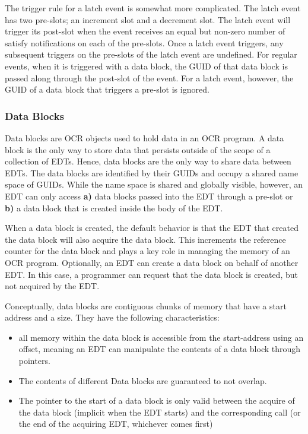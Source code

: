 The trigger rule for a latch event is somewhat more complicated. The
latch event has two pre-slots; an increment slot and a decrement
slot. The latch event will trigger its post-slot when the event
receives an equal but non-zero number of satisfy notifications on each
of the pre-slots. Once a latch event triggers, any subsequent
triggers on the pre-slots of the latch event are undefined. For
regular events, when it is triggered with a data block, the GUID of
that data block is passed along through the post-slot of the
event. For a latch event, however, the GUID of a data block that
triggers a pre-slot is ignored.

\subsubsection{Data Blocks}
\label{sec:datablocks}
Data blocks are OCR objects used to hold data in an OCR program. A
data block is the only way to store data that persists outside of the
scope of a collection of EDTs. Hence, data blocks are the only way to
share data between EDTs. The data blocks are identified by their
GUIDs and occupy a shared name space of GUIDs. While the name space
is shared and globally visible, however, an EDT can only access {\bf a)}
data blocks passed into the EDT through a pre-slot or {\bf b)} a data block
that is created inside the body of the EDT.

When a data block is created, the default behavior is that the EDT
that created the data block will also acquire the data block. This
increments the reference counter for the data block and plays a key
role in managing the memory of an OCR program. Optionally, an EDT can
create a data block on behalf of another EDT. In this case, a
programmer can request that the data block is created, but not
acquired by the EDT.

Conceptually, data blocks are contiguous chunks of memory
that have a start address and a size. They have the following characteristics:
\begin{itemize}
\item all memory within the data block is accessible from the
start-address using an offset, meaning an EDT can manipulate the
contents of a data block through pointers.
\item The contents of different Data blocks are guaranteed to not
overlap.
\item The pointer to the start of a data block is only valid between
the acquire of the data block (implicit when the EDT starts) and the
corresponding  call (or the end of the acquiring
EDT, whichever comes first)
\end{itemize}

